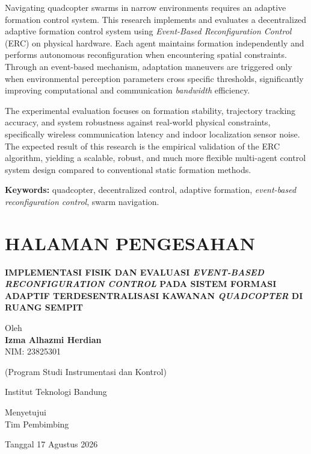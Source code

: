 \documentclass[12pt,a4paper]{report}
\numberwithin{equation}{chapter}
\begin{document}
\vspace{0.8cm}

\noindent
Navigating quadcopter swarms in narrow environments requires an adaptive formation control system. This research implements and evaluates a decentralized adaptive formation control system using \textit{Event-Based Reconfiguration Control} (ERC) on physical hardware. Each agent maintains formation independently and performs autonomous reconfiguration when encountering spatial constraints. Through an event-based mechanism, adaptation maneuvers are triggered only when environmental perception parameters cross specific thresholds, significantly improving computational and communication \textit{bandwidth} efficiency.

\noindent
The experimental evaluation focuses on formation stability, trajectory tracking accuracy, and system robustness against real-world physical constraints, specifically wireless communication latency and indoor localization sensor noise. The expected result of this research is the empirical validation of the ERC algorithm, yielding a scalable, robust, and much more flexible multi-agent control system design compared to conventional static formation methods.

\vspace{1cm}
\noindent \textbf{Keywords:} quadcopter, decentralized control, adaptive formation, \textit{event-based reconfiguration control}, swarm navigation.

\chapter*{HALAMAN PENGESAHAN}

\begin{center}
    \textbf{IMPLEMENTASI FISIK DAN EVALUASI \textit{EVENT-BASED RECONFIGURATION CONTROL} PADA SISTEM FORMASI ADAPTIF TERDESENTRALISASI KAWANAN \textit{QUADCOPTER} DI RUANG SEMPIT}

    \vspace{0.8cm}
    Oleh\\
    \textbf{Izma Alhazmi Herdian}\\
    NIM: 23825301

    \vspace{0.8cm}
    (Program Studi Instrumentasi dan Kontrol)

    \vspace{0.8cm}
    Institut Teknologi Bandung

    \vspace{1.5cm}
    Menyetujui\\
    Tim Pembimbing

    \vspace{0.8cm}
    Tanggal 17 Agustus 2026
\end{center}
\end{document}
